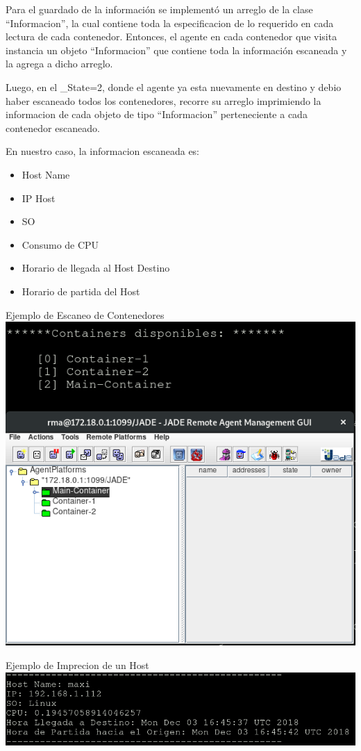 \documentclass[11pt]{extarticle}
\providecommand{\tightlist}{%
      \setlength{\itemsep}{0pt}\setlength{\parskip}{0pt}}
\begin{document}
Para el guardado de la información se implementó un arreglo de la clase
``Informacion'', la cual contiene toda la especificacion de lo requerido
en cada lectura de cada contenedor. Entonces, el agente en cada
contenedor que visita instancia un objeto ``Informacion'' que contiene
toda la información escaneada y la agrega a dicho arreglo.

Luego, en el \_State=2, donde el agente ya esta nuevamente en destino y
debio haber escaneado todos los contenedores, recorre su arreglo
imprimiendo la informacion de cada objeto de tipo ``Informacion''
perteneciente a cada contenedor escaneado.

En nuestro caso, la informacion escaneada es:

\begin{itemize}
\tightlist
\item
  Host Name
\item
  IP Host
\item
  SO
\item
  Consumo de CPU
\item
  Horario de llegada al Host Destino
\item
  Horario de partida del Host
\end{itemize}

Ejemplo de Escaneo de Contenedores
\includegraphics{images/ListadoCircular-1.png}

Ejemplo de Imprecion de un Host \includegraphics{images/Escaneo.png}
\end{document}
